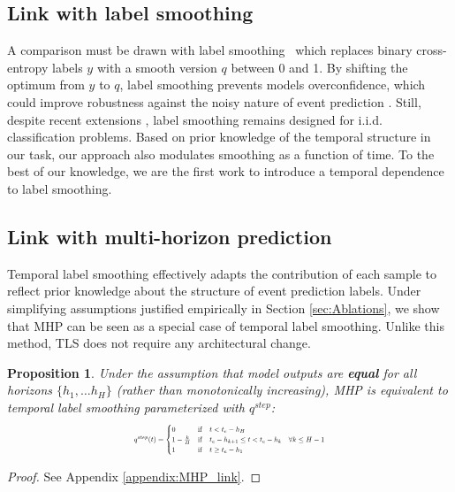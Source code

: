 \documentclass[nohyperref]{article}
\newtheorem{theorem}{Proposition}
\begin{document}
\subsection{Link with label smoothing}
A comparison must be drawn with label smoothing~\citep{DBLP:conf/cvpr/SzegedyVISW16} which replaces binary cross-entropy labels $y$ with a smooth version $q$ between 0 and 1. By shifting the optimum from $y$ to $q$, label smoothing prevents models overconfidence, which could improve robustness against the noisy nature of event prediction \citep{DBLP:conf/icml/LukasikBMK20, DBLP:conf/nips/MullerKH19}. Still, despite recent extensions \cite{DBLP:conf/aistats/LiDB20,DBLP:conf/acl/MeisterSC20,DBLP:conf/aaai/LienenH21}, label smoothing remains designed for i.i.d. classification problems. Based on prior knowledge of the temporal structure in our task, our approach also modulates smoothing as a function of time. To the best of our knowledge, we are the first work to introduce a temporal dependence to label smoothing. 

\subsection{Link with multi-horizon prediction}\label{sec:link_mhp}

Temporal label smoothing effectively adapts the contribution of each sample to reflect prior knowledge about the structure of event prediction labels. Under simplifying assumptions justified empirically in Section \ref{sec:Ablations}, we show that MHP can be seen as a special case of temporal label smoothing.  Unlike this method, TLS does not require any architectural change. 




\begin{theorem}
\label{prop:MHP}
Under the assumption that model outputs are \textbf{equal} for all horizons $\{h_1,\ldots h_H\}$ (rather than monotonically increasing), MHP is equivalent to temporal label smoothing parameterized with $q^{step}$:\begin{equation*}
\resizebox{0.45\textwidth}{!}{$
    q^{step}(t) = 
    \begin{cases}
    0 & \mathrm{if} \quad t < t_e - h_H \\
    1-\frac{k}{H} & \mathrm{if} \quad  t_e -  h_{k+1} \leq   t < t_e -h_k  \quad \forall k \leq H -1 \\
    1 & \mathrm{if}  \quad  t \geq t_e -h_1
    \end{cases}$}
\end{equation*}
\end{theorem}
\begin{comment}\begin{figure}
    \centering
    \texttt{[image: figures/step\_smoothing\_time.pdf]}
    \caption{\textbf{Label smoothing strength over time}, with staircase parametrization and $(h_{min},h_{max})=(0,2h)$.}
    \label{fig:smoothing_MHP}
\end{figure}
\end{comment}
\begin{proof} See Appendix \ref{appendix:MHP_link}.\end{proof}
\end{document}
